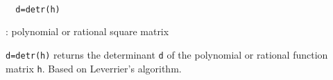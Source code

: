 
\begin{mandesc}
   \\ %
\end{mandesc}
\begin{calling_sequence}
\begin{verbatim}
  d=detr(h)  
\end{verbatim}
\end{calling_sequence}
\begin{parameters}
  \begin{varlist}
    : polynomial or rational square matrix
  \end{varlist}
\end{parameters}
\begin{mandescription}
  \verb!d=detr(h)! returns the determinant \verb!d! of the polynomial or 
  rational function matrix \verb!h!. Based on Leverrier's algorithm.
\end{mandescription}
\begin{manseealso}
     
\end{manseealso}
